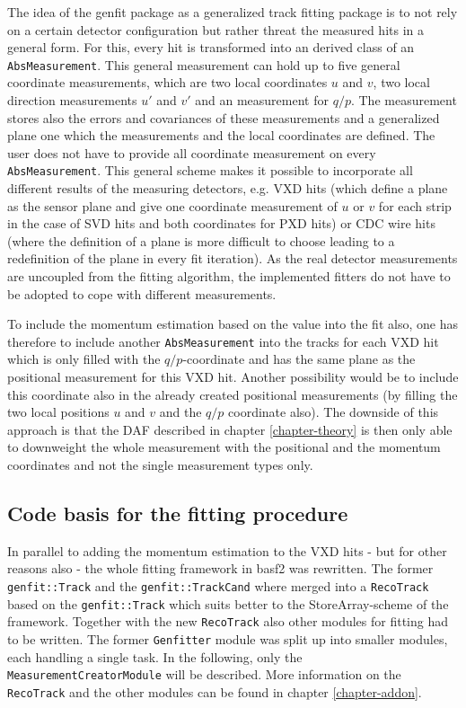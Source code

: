 The idea of the genfit package as a generalized track fitting package is to not rely on a certain detector configuration but rather threat the measured hits in a general form. For this, every hit is transformed into an derived class of an \texttt{AbsMeasurement}. This general measurement can hold up to five general coordinate measurements, which are two local coordinates $u$ and $v$, two local direction measurements $u'$ and $v'$ and an measurement for $q/p$. The measurement stores also the errors and covariances of these measurements and a generalized plane one which the measurements and the local coordinates are defined. The user does not have to provide all coordinate measurement on every \texttt{AbsMeasurement}. This general scheme makes it possible to incorporate all different results of the measuring detectors, e.g. VXD hits (which define a plane as the sensor plane and give one coordinate measurement of $u$ or $v$ for each strip in the case of SVD hits and both coordinates for PXD hits) or CDC wire hits (where the definition of a plane is more difficult to choose leading to a redefinition of the plane in every fit iteration). As the real detector measurements are uncoupled from the fitting algorithm, the implemented fitters do not have to be adopted to cope with different measurements.

To include the momentum estimation based on the \dedx value into the fit also, one has therefore to include another \texttt{AbsMeasurement} into the tracks for each VXD hit which is only filled with the $q/p$-coordinate and has the same plane as the positional measurement for this VXD hit. Another possibility would be to include this coordinate also in the already created positional measurements (by filling the two local positions $u$ and $v$ and the $q/p$ coordinate also). The downside of this approach is that the DAF described in chapter \ref{chapter-theory} is then only able to downweight the whole measurement with the positional and the momentum coordinates and not the single measurement types only.

\subsection{Code basis for the fitting procedure}

In parallel to adding the momentum estimation to the VXD hits - but for other reasons also - the whole fitting framework in basf2 was rewritten. The former \texttt{genfit::Track} and the \texttt{genfit::TrackCand} where merged into a \texttt{RecoTrack} based on the \texttt{genfit::Track} which suits better to the StoreArray-scheme of the framework. Together with the new \texttt{RecoTrack} also other modules for fitting had to be written. The former \texttt{Genfitter} module was split up into smaller modules, each handling a single task. In the following, only the \texttt{MeasurementCreatorModule} will be described. More information on the \texttt{RecoTrack} and the other modules can be found in chapter \ref{chapter-addon}.

